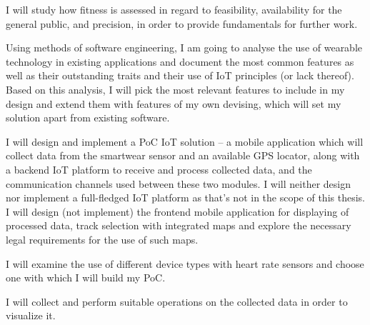 I will study how fitness is assessed in regard to feasibility, availability for the general public, and precision, in order to provide fundamentals for further work.

Using methods of software engineering, I am going to analyse the use of wearable technology in existing applications and document the most common features as well as their outstanding traits and their use of IoT principles (or lack thereof).
Based on this analysis, I will pick the most relevant features to include in my design and extend them with features of my own devising, which will set my solution apart from existing software.

I will design and implement a PoC IoT solution -- a mobile application which will collect data from the smartwear sensor and an available GPS locator, along with a backend IoT platform to receive and process collected data, and the communication channels used between these two modules.
I will neither design nor implement a full-fledged IoT platform as that's not in the scope of this thesis.
I will design (not implement) the frontend mobile application for displaying of processed data, track selection with integrated maps and explore the necessary legal requirements for the use of such maps.

I will examine the use of different device types with heart rate sensors and choose one with which I will build my PoC.

I will collect and perform suitable operations on the collected data in order to visualize it.
